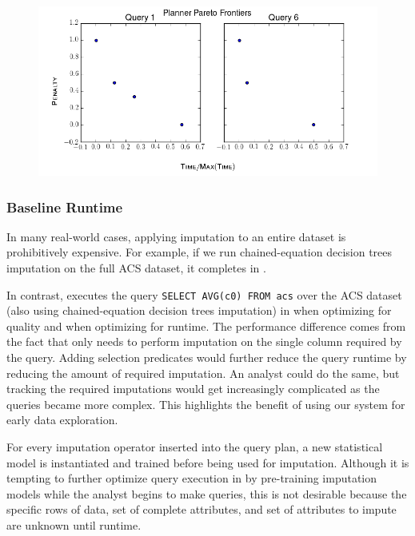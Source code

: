 \begin{figure}
\centering
\includegraphics[scale=0.4]{figures/pareto_frontiers_plot.png}
\caption{}
\label{fig:pareto-frontiers}
\end{figure}

\subsubsection{Baseline Runtime}
In many real-world cases, applying imputation to an entire dataset is prohibitively expensive.
For example, if we run chained-equation decision trees imputation on the full ACS dataset, it completes in \acsbaseresultminutes{}.

In contrast, \ProjectName{} executes the query \lstinline{SELECT AVG(c0) FROM acs} over the ACS dataset (also using chained-equation decision trees imputation) in \acsimputedbzeroresult{} when optimizing for quality and \acsimputedboneresult{} when optimizing for runtime.
The performance difference comes from the fact that \ProjectName{} only needs to perform imputation on the single column required by the query.
Adding selection predicates would further reduce the query runtime by reducing the amount of required imputation.
An analyst could do the same, but tracking the required imputations would get increasingly complicated as the queries became more complex.
This highlights the benefit of using our system for early data exploration.

For every imputation operator inserted into the query plan, a new statistical model is instantiated and trained before being used for imputation.
Although it is tempting to further optimize query execution in \ProjectName{} by pre-training imputation models while the analyst begins to make queries,
this is not desirable because the specific rows of data, set of complete attributes, and set of attributes to impute are unknown until runtime.

